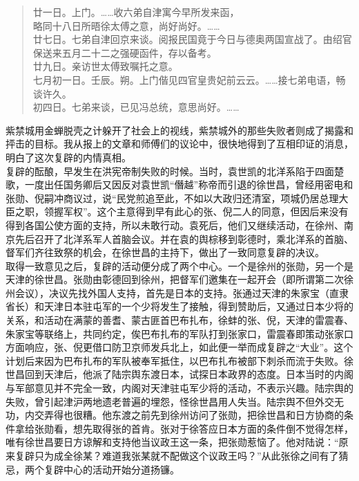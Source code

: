 \begin{quote}
廿一日。上门。……收六弟自津寓今早所发来函，\\

略同十八日所晤徐太傅之意，尚好尚好。……\\

廿七日。七弟自津回京来谈。阅报民国竟于今日与德奥两国宣战了。由绍官保送来五月二十二之强硬函件，存以备考。\\

廿九日。亲访世太傅致嘱托之意。\\

七月初一日。壬辰。朔。上门偕见四官皇贵妃前云云。……接七弟电语，畅谈许久。\\

初四日。七弟来谈，已见冯总统，意思尚好。……\\
\end{quote}

紫禁城用金蝉脱壳之计躲开了社会上的视线，紫禁城外的那些失败者则成了揭露和抨击的目标。我从报上的文章和师傅们的议论中，很快地得到了互相印证的消息，明白了这次复辟的内情真相。\\

复辟的酝酿，早发生在洪宪帝制失败的时候。当时，袁世凯的北洋系陷于四面楚歌，一度出任国务卿后又因反对袁世凯“僭越”称帝而引退的徐世昌，曾经用密电和张勋、倪嗣冲商议过，说“民党煎追至此，不如以大政归还清室，项城仍居总理大臣之职，领握军权”。这个主意得到早有此心的张、倪二人的同意，但因后来没有得到各国公使方面的支持，所以未敢行动。袁死后，他们又继续活动，在徐州、南京先后召开了北洋系军人首脑会议。并在袁的舆棕移到彰德时，乘北洋系的首脑、督军们齐往致祭的机会，在徐世昌的主持下，做出了一致同意复辟的决议。\\

取得一致意见之后，复辟的活动便分成了两个中心。一个是徐州的张勋，另一个是天津的徐世昌。张勋由彰德回到徐州，把督军们邀集在一起开会（即所谓第二次徐州会议），决议先找外国人支持，首先是日本的支持。张通过天津的朱家宝（直隶省长）和天津日本驻屯军的一个少将发生了接触，得到赞助后，又通过日本少将的关系，和活动在满蒙的善耆、蒙古匪首巴布扎布，徐蚌的张、倪，天津的雷震春、朱家宝等联络上，共同约定，俟巴布扎布的军队打到张家口，雷震春即策动张家口方面响应，张、倪更借口防卫京师发兵北上，如此便一举而成复辟之“大业”。这个计划后来因为巴布扎布的军队被奉军抵住，以巴布扎布被部下刺杀而流于失败。徐世昌回到天津后，他派了陆宗舆东渡日本，试探日本政界的态度。日本当时的内阁与军部意见并不完全一致，内阁对天津驻屯军少将的活动，不表示兴趣。陆宗舆的失败，曾引起津沪两地遗老普遍的埋怨，怪徐世昌用人失当。陆宗舆不但外交无功，内交弄得也很糟。他东渡之前先到徐州访问了张勋，把徐世昌和日方协商的条件拿给张勋看，想先取得张的首肯。张对于徐答应日本方面的条件倒不觉得怎样，唯有徐世昌要日方谅解和支持他当议政王这一条，把张勋惹恼了。他对陆说：“原来复辟只为成全徐某？难道我张某就不配做这个议政王吗？”从此张徐之间有了猜忌，两个复辟中心的活动开始分道扬镰。\\

